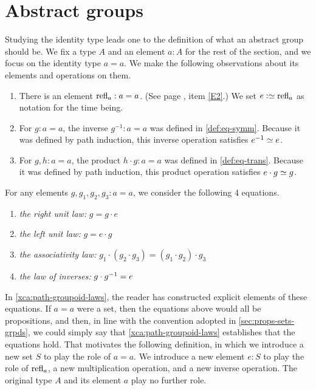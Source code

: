 \section{Abstract groups}
\label{sec:identity-type-as-abstract}

Studying the identity type leads one to the definition of what an abstract group should be.  We fix a type $A$ and an element $a:A$ for the rest
of the section, and we focus on the identity type $a=a$.  We make the following observations about its elements and operations on them.

\begin{enumerate}
\item
  There is an element $\mathrm{refl}_{a} : a=a$.
  (See page \pageref{rules-for-equality}, item \ref{E2}.)
  We set $e \defeq \refl a$ as notation for the time being.
\item
  For $g : a=a$, the inverse $g^{-1} : a=a$ was defined in \cref{def:eq-symm}.
  Because it was defined by path induction, this inverse operation satisfies $e^{-1} \jdeq e$.
\item
  For $g, h : a=a$, the product $h \cdot g : a=a$ was defined in \cref{def:eq-trans}.
  Because it was defined by path induction, this product operation satisfies $e \cdot g \jdeq g$.
\end{enumerate}

For any elements $g,g_1,g_2,g_3:a=a$, we consider the following 4 equations.
\begin{enumerate}
\item
  \label{it:right-unit} \emph{the right unit law:} $g=g\cdot e$  
\item
  \label{it:left-unit} \emph{the left unit law:} $g=e\cdot g$ 
\item
  \label{it:associativity} \emph{the associativity law:} $g_1\cdot(g_2\cdot g_3)=(g_1\cdot g_2)\cdot g_3$ 
\item
  \label{it:inverse} \emph{the law of inverses:} $g\cdot g^{-1} = e$ 
\end{enumerate}

In \cref{xca:path-groupoid-laws}, the reader has constructed explicit elements of these equations.  If $a=a$ were a set, then the equations
above would all be propositions, and then, in line with the convention adopted in \cref{sec:props-sets-grpds}, we could simply say that
\cref{xca:path-groupoid-laws} establishes that the equations hold.  That motivates the following definition, in which we introduce a new set $S$
to play the role of $a=a$.  We introduce a new element $e:S$ to play the role of $\mathrm{refl}_{a}$, a new multiplication operation, and a new inverse
operation.  The original type $A$ and its element $a$ play no further role.

